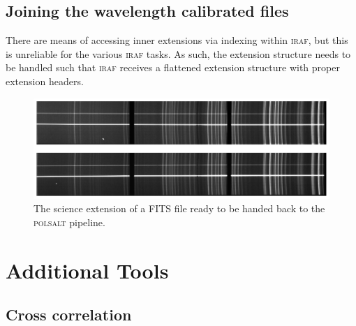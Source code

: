 


\subsection{Joining the wavelength calibrated files}

There are means of accessing inner extensions via indexing within \textsc{iraf}, but this is unreliable for the various \textsc{iraf} tasks. As such, the extension structure needs to be handled such that \textsc{iraf} receives a flattened extension structure with proper extension headers.
\prgph


\begin{figure}[t]
    \centering
    \includegraphics[width = 1.0\textwidth]{figures/3_post_wav_cal.pdf}
    \caption{The science extension of a \gls{FITS} file ready to be handed back to the \textsc{polsalt} pipeline.}
    \label{fig:polsalt_pre_wav_cal}
\end{figure}


\section{Additional Tools}\label{sec:add_tools}


\subsection{Cross correlation}

